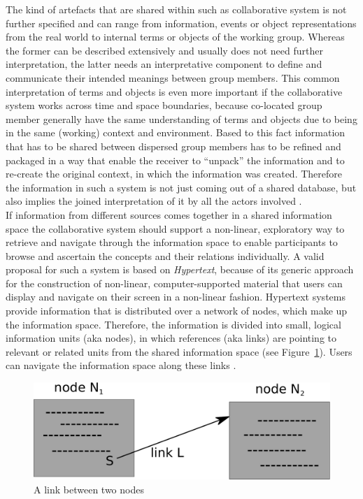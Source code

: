 The kind of artefacts that are shared within such as collaborative system is not further specified and can range from information, events or object representations from the real world to internal terms or objects of the working group. Whereas the former can be described extensively and usually does not need further interpretation, the latter needs an interpretative component to define and communicate their intended meanings between group members. This common interpretation of terms and objects is even more important if the collaborative system works across time and space boundaries, because co-located group member generally have the same understanding of terms and objects due to being in the same (working) context and environment. Based to this fact information that has to be shared between dispersed group members has to be refined and packaged in a way that enable the receiver to ``unpack'' the information and to re-create the original context, in which the information was created. Therefore the information in such a system is not just coming out of a shared database, but also implies the joined interpretation of it by all the actors involved \citep{bannon1997constructing}. \\

If information from different sources comes together in a shared information space the collaborative system should support a non-linear, exploratory way to retrieve and navigate through the information space to enable participants to browse and ascertain the concepts and their relations individually. A valid proposal for such a system is based on \emph{Hypertext}, because of its generic approach for the construction of non-linear, computer-supported material that users can display and navigate on their screen in a non-linear fashion. Hypertext systems provide information that is distributed over a network of nodes, which make up the information space. Therefore, the information is divided into small, logical information units (aka nodes), in which references (aka links) are pointing to relevant or related units from the shared information space (see Figure~\ref{fig:images_cscw_hypertext_concept}). Users can navigate the information space along these links \citep[pg. 295-307]{borghoff2000computer}. \@

\begin{figure}[H]
  \centering
  \includegraphics[width=0.9\columnwidth]{images/Hypertext.pdf}
  \caption[A link between two nodes]{A link between two nodes \citep[pg. 303]{borghoff2000computer}}
  \label{fig:images_cscw_hypertext_concept}
\end{figure}

